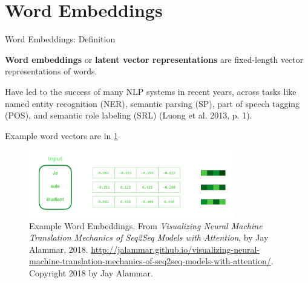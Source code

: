 
\section{Word Embeddings}


\begin{frame}{Word Embeddings: Definition}




    \begin{itemizeSpaced}{7pt}
        \item \textbf{Word embeddings} or \textbf{latent vector representations} are fixed-length vector representations of words. 
        
        \item Have led to the success of many NLP systems in recent years, across tasks like named entity recognition (NER), semantic parsing (SP), part of speech tagging (POS), and semantic role labeling (SRL) (Luong et al. 2013, p. 1).
        
    \end{itemizeSpaced}
    
    Example word vectors are in \cref{fig:exampleWordEmb}
    
    \begin{figure}[h]
    \centering
    \includegraphics[width=0.8\textwidth]{imgs/example_word_embedding.png}
    \caption{\scriptsize Example Word Embeddings. From \emph{Visualizing Neural Machine Translation Mechanics of Seq2Seq Models with Attention}, by Jay Alammar, 2018. \url{http://jalammar.github.io/visualizing-neural-machine-translation-mechanics-of-seq2seq-models-with-attention/}. Copyright 2018 by Jay Alammar.}
    \label{fig:exampleWordEmb}
    \end{figure}
    
\end{frame}




